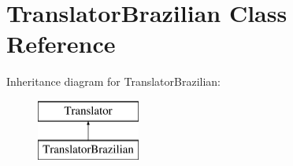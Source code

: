 \hypertarget{class_translator_brazilian}{}\section{Translator\+Brazilian Class Reference}
\label{class_translator_brazilian}
Inheritance diagram for Translator\+Brazilian\+:\begin{figure}[H]
\begin{center}
\leavevmode
\includegraphics[height=2.000000cm]{class_translator_brazilian}
\end{center}
\end{figure}
